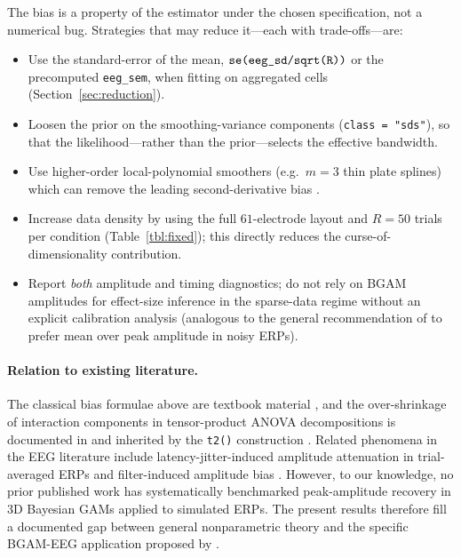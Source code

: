 \documentclass[12pt, a4paper]{article}
\begin{document}
The bias is a property of the estimator under the chosen specification, not
a numerical bug. Strategies that may reduce it---each with trade-offs---are:
\begin{itemize}
  \item Use the standard-error of the mean, $\verb|se(eeg_sd/sqrt(R))|$ or
        the precomputed \texttt{eeg\_sem}, when fitting on aggregated cells
        (Section~\ref{sec:reduction}).
  \item Loosen the prior on the smoothing-variance components
        (\texttt{class = "sds"}), so that the likelihood---rather than the
        prior---selects the effective bandwidth.
  \item Use higher-order local-polynomial smoothers (e.g.\
        $m = 3$ thin plate splines) which can remove the leading
        second-derivative bias \citep[\S 3.1]{FanGijbels1996}.
  \item Increase data density by using the full $61$-electrode layout and
        $R = 50$ trials per condition (Table~\ref{tbl:fixed}); this directly
        reduces the curse-of-dimensionality contribution.
  \item Report \emph{both} amplitude and timing diagnostics; do not rely on
        BGAM amplitudes for effect-size inference in the sparse-data regime
        without an explicit calibration analysis (analogous to the general
        recommendation of \citet[Ch.~6]{Luck2014} to prefer mean over peak
        amplitude in noisy ERPs).
\end{itemize}

\paragraph{Relation to existing literature.}
The classical bias formulae above are textbook material
\citep{WandJones1995,FanGijbels1996}, and the over-shrinkage of interaction
components in tensor-product ANOVA decompositions is documented in
\citet[\S 3]{Gu2002} and inherited by the \texttt{t2()} construction
\citep{WoodScheiplFaraway2013}. Related phenomena in the EEG literature
include latency-jitter-induced amplitude attenuation in trial-averaged
ERPs \citep[Ch.~6]{Luck2014} and filter-induced amplitude bias
\citep{Acunzo2012}. However, to our knowledge, no prior published work has
systematically benchmarked peak-amplitude recovery in 3D Bayesian GAMs
applied to simulated ERPs. The present results therefore fill a documented
gap between general nonparametric theory and the specific BGAM-EEG
application proposed by \citet{Nalborczyk2025}.


\end{document}
